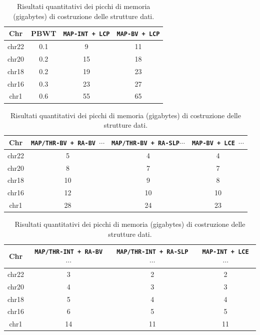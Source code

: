 \begin{table}
  \centering
  \caption{Risultati quantitativi dei picchi di memoria (gigabytes) di
    costruzione delle 
    strutture dati.} 
  \label{tab:makemem}
  \footnotesize
  \begin{tabular}{c||c|c|c} 
    \textbf{Chr}
    & \textbf{PBWT}
    & \textbf{\texttt{MAP-INT \newline+ LCP}}
    & \textbf{\texttt{MAP-BV \newline+ LCP}}\\
    \hline
    \hline
    chr22 & 0.1 & 9 & 11  \\
    chr20 & 0.2 & 15 & 18 \\
    chr18 & 0.2 & 19 & 23 \\
    chr16 & 0.3 & 23 & 27 \\
    chr1 & 0.6 & 55 & 65  \\
  \end{tabular}
  \vspace{+3mm}
  \vspace{+1mm}
  \begin{tabular}{c||c|c|c} 
    \textbf{Chr}
    & \textbf{\texttt{MAP/THR-BV + RA-BV $\cdots$}}
    & \textbf{\texttt{MAP/THR-BV + RA-SLP$\cdots$}}
    & \textbf{\texttt{MAP-BV + LCE $\cdots$}}\\
    \hline
    \hline
    chr22 & 5 & 4 & 4 \\
    chr20 & 8 & 7 & 7 \\
    chr18 & 10 & 9 & 8  \\
    chr16 & 12 & 10 & 10 \\
    chr1 & 28 & 24 & 23 \\
  \end{tabular}
  \vspace{+3mm}
  \vspace{+1mm}
  \begin{tabular}{c||c|c|c} 
    \textbf{Chr}
    & \textbf{\texttt{MAP/THR-INT + RA-BV $\cdots$}}
    & \textbf{\texttt{MAP/THR-INT + RA-SLP $\cdots$}}
    & \textbf{\texttt{MAP-INT + LCE $\cdots$}}\\
    \hline
    \hline
    chr22 & 3 & 2 & 2 \\
    chr20 & 4 & 3 & 3 \\
    chr18 & 5 & 4 & 4 \\
    chr16 & 6 & 5 & 5 \\
    chr1 & 14 & 11 & 11 \\

  \end{tabular}
\end{table}
